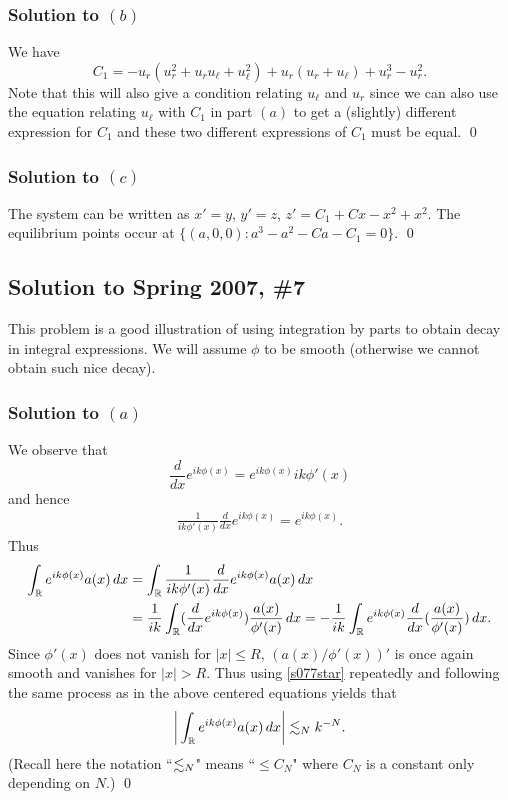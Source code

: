 \subsubsection*{Solution to $(b)$}
We have
$$C_{1} = -u_{r}(u_{r}^{2} + u_{r}u_{\ell} + u_{\ell}^{2}) + u_{r}(u_{r} + u_{\ell}) + u_{r}^{3} - u_{r}^{2}.$$
Note that this will also give a condition relating $u_{\ell}$ and $u_{r}$ since we can also use the equation relating
$u_{\ell}$ with $C_{1}$ in part $(a)$ to get a (slightly) different expression for $C_{1}$ and these two different expressions
of $C_{1}$ must be equal.
\hfill\qed

\subsubsection*{Solution to $(c)$}
The system can be written as $x' = y$, $y' = z$, $z' = C_{1} + Cx - x^{2} + x^{2}$. The equilibrium points occur
at $\{(a, 0, 0): a^{3} - a^{2} - Ca - C_{1} = 0\}$.
\hfill\qed

\subsection*{Solution to Spring 2007, \#7}
This problem is a good illustration of using integration by parts to obtain decay in integral expressions.
We will assume $\phi$ to be smooth (otherwise we cannot obtain such nice decay).

\subsubsection*{Solution to $(a)$}
We observe that
$$\frac{d}{dx}e^{ik\phi(x)} = e^{ik\phi(x)}ik\phi'(x)$$
and hence
\begin{align}\label{s077star}
\frac{1}{ik\phi'(x)}\frac{d}{dx}e^{ik\phi(x)} = e^{ik\phi(x)}.
\end{align}
Thus
\begin{align*}
\int_{\mathbb{R}}e^{ik\phi(x)}a(x)\, dx& = \int_{\mathbb{R}}\frac{1}{ik\phi'(x)}\frac{d}{dx}e^{ik\phi(x)}a(x)\, dx\\
& = \frac{1}{ik}\int_{\mathbb{R}}(\frac{d}{dx}e^{ik\phi(x)})\frac{a(x)}{\phi'(x)}\, dx = -\frac{1}{ik}\int_{\mathbb{R}}e^{ik\phi(x)}\frac{d}{dx}(\frac{a(x)}{\phi'(x)})\, dx.
\end{align*}
Since $\phi'(x)$ does not vanish for $|x| \leq R$, $(a(x)/\phi'(x))'$ is once again smooth and vanishes for $|x| > R$. Thus using \eqref{s077star} repeatedly
and following the same process as in the above centered equations yields that
$$\bigg| \int_{\mathbb{R}}e^{ik\phi(x)}a(x)\, dx \bigg| \lesssim_{N} k^{-N}.$$
(Recall here the notation ``$\lesssim_{N}$" means ``$\leq C_{N}$" where $C_{N}$ is a constant only depending on $N$.)
\hfill\qed

